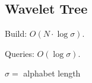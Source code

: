 \subsection{Wavelet Tree}

Build: $O(N \cdot \log \sigma)$.

Queries: $O(\log \sigma)$.

$\sigma =$ alphabet length
